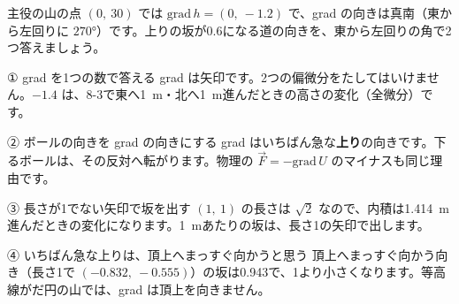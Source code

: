 \begin{jibun}
主役の山の点 $(0,\ 30)$ では $\mathrm{grad}\,h=(0,\ -1.2)$ で、grad の向きは真南（東から左回りに $270°$）です。上りの坂が0.6になる道の向きを、東から左回りの角で2つ答えましょう。
\end{jibun}


\begin{tsumazuki}{① grad を1つの数で答える}
grad は矢印です。2つの偏微分をたしてはいけません。$-1.4$ は、8-3で東へ\qty{1}{m}・北へ\qty{1}{m}進んだときの高さの変化（全微分）です。
\end{tsumazuki}

\begin{tsumazuki}{② ボールの向きを grad の向きにする}
grad はいちばん急な\textbf{上り}の向きです。下るボールは、その反対へ転がります。物理の $\vec F=-\mathrm{grad}\,U$ のマイナスも同じ理由です。
\end{tsumazuki}

\begin{tsumazuki}{③ 長さが1でない矢印で坂を出す}
$(1,\ 1)$ の長さは $\sqrt2$ なので、内積は\qty{1.414}{m}進んだときの変化になります。\qty{1}{m}あたりの坂は、長さ1の矢印で出します。
\end{tsumazuki}

\begin{tsumazuki}{④ いちばん急な上りは、頂上へまっすぐ向かうと思う}
頂上へまっすぐ向かう向き（長さ1で $(-0.832,\ -0.555)$）の坂は0.943で、1より小さくなります。等高線がだ円の山では、grad は頂上を向きません。
\end{tsumazuki}


